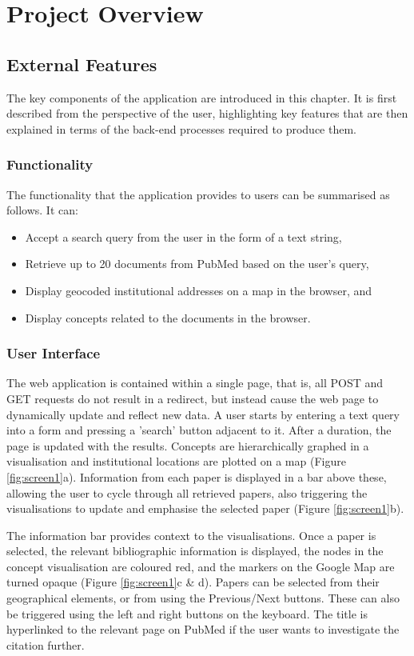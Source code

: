 \documentclass[Report.tex]{subfiles}
\begin{document}
\chapter{Project Overview}
\section{External Features}
The key components of the application are introduced in this chapter. It is first described from the perspective of the user, highlighting key features that are then explained in terms of the back-end processes required to produce them.

\subsection{Functionality}
The functionality that the application provides to users can be summarised as follows. It can:
\begin{itemize}
\item Accept a search query from the user in the form of a text string,
\item Retrieve up to 20 documents from PubMed based on the user's query,
\item Display geocoded institutional addresses on a map in the browser, and
\item Display concepts related to the documents in the browser.
\end{itemize}

\subsection{User Interface}
The web application is contained within a single page, that is, all POST and GET requests do not result in a redirect, but instead cause the web page to dynamically update and reflect new data. A user starts by entering a text query into a form and pressing a 'search' button adjacent to it. After a duration, the page is updated with the results. Concepts are hierarchically graphed in a visualisation and institutional locations are plotted on a map (Figure \ref{fig:screen1}a). Information from each paper is displayed in a bar above these, allowing the user to cycle through all retrieved papers, also triggering the visualisations to update and emphasise the selected paper (Figure \ref{fig:screen1}b).\newline

\noindent The information bar provides context to the visualisations. Once a paper is selected, the relevant bibliographic information is displayed, the nodes in the concept visualisation are coloured red, and the markers on the Google Map are turned opaque (Figure \ref{fig:screen1}c \& d). Papers can be selected from their geographical elements, or from using the Previous/Next buttons. These can also be triggered using the left and right buttons on the keyboard. The title is hyperlinked to the relevant page on PubMed if the user wants to investigate the citation further.\newpage
\end{document}
